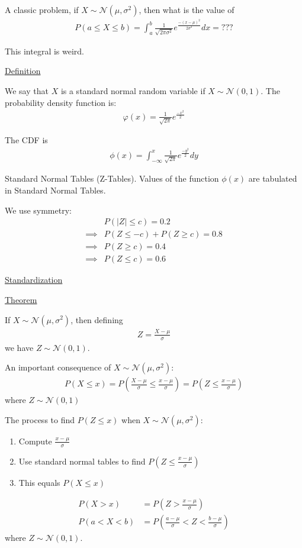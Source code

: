 \documentclass{article}
\begin{document}
A classic problem, if $X \sim \mathcal{N}(\mu, \sigma^2)$, then what is the value of
\begin{align*}
    P(a \le X \le b) = \int_a^b \frac{1}{\sqrt{2\pi \sigma^2}}e^{\frac{-(x-\mu)^2}{2\sigma^2}}dx = ???
\end{align*}

This integral is weird. 

\underline{Definition}

We say that $X$ is a standard normal random variable if $X \sim \mathcal{N}(0,1)$. The probability density function is:
\begin{align*}
    \varphi(x) = \frac{1}{\sqrt{2\pi}}e^{\frac{-x^2}{2}}
\end{align*}

The CDF is
\begin{align*}
    \phi(x) = \int_{-\infty}^x \frac{1}{\sqrt{2\pi}}e^{\frac{-y^2}{2}}dy
\end{align*}

Standard Normal Tables (Z-Tables). Values of the function $\phi(x)$ are tabulated in Standard Normal Tables.

We use symmetry:
\begin{align*}
    &P(|Z|\le c) = 0.2 \\
    \implies &P(Z \le -c) + P(Z \ge c) = 0.8 \\
    \implies &P(Z \ge c) = 0.4 \\
    \implies &P(Z \le c) = 0.6
\end{align*}

\underline{Standardization}

\underline{Theorem}

If $X \sim \mathcal{N}(\mu,\sigma^2)$, then defining
\begin{align*}
    Z = \frac{X - \mu}{\sigma}
\end{align*}
we have $Z \sim \mathcal{N}(0,1)$.

An important consequence of $X \sim \mathcal{N}(\mu, \sigma^2)$:
\begin{align*}
    P(X \le x) = P\left ( \frac{X - \mu}{\sigma} \le \frac{x - \mu}{\sigma}\right ) = P\left (Z \le \frac{x - \mu}{\sigma}\right )
\end{align*}
where $Z \sim \mathcal{N}(0,1)$

The process to find $P(Z \le x) $ when $X \sim \mathcal{N}(\mu, \sigma^2)$:
\begin{enumerate}
    \item Compute $\frac{x-\mu}{\sigma}$
    \item Use standard normal tables to find $P\left (Z \le \frac{x-\mu}{\sigma}\right)$
    \item This equals $P(X \le x)$
\end{enumerate}
\begin{align*}
    P(X > x) &= P\left(Z > \frac{x - \mu}{\sigma}\right) \\
    P( a < X < b) &= P\left( \frac{a-\mu}{\sigma} < Z < \frac{b - \mu}{\sigma}\right)
\end{align*}
where $Z \sim \mathcal{N}(0,1)$.
\end{document}
